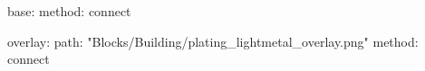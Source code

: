 base:
  method: connect

  overlay:
  path: "Blocks/Building/plating_lightmetal_overlay.png"
  method: connect